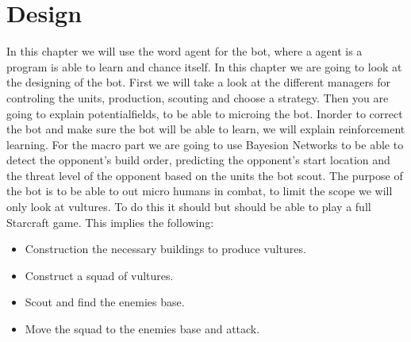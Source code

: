 \chapter{Design}\label{design}
	 In this chapter we will use the word agent for the bot, where a agent is a program is able to learn and chance itself.
	In this chapter we are going to look at the designing of the bot. First we will take a look at the different managers for controling the units, production,
	scouting and choose a strategy. Then you are going to explain potentialfields, to be able to microing the bot. Inorder to correct the bot and make
	sure the bot will be able to learn, we will explain reinforcement learning. For the macro part we are going to use Bayesion Networks to be able to
	detect the opponent's build order, predicting the opponent's start location and the threat level of the opponent based on the units the bot scout.
	The purpose of the bot is to be able to out micro humans in combat, to limit the scope we will only look at vultures. 
	To do this it should but should be able to play a full Starcraft game. This implies the following:
	\begin{itemize}
		\item Construction the necessary buildings to produce vultures.
		\item Construct a squad of vultures.
		\item Scout and find the enemies base.
		\item Move the squad to the enemies base and attack.
	\end{itemize}
	
	
	
	
	
	
	
	
	
